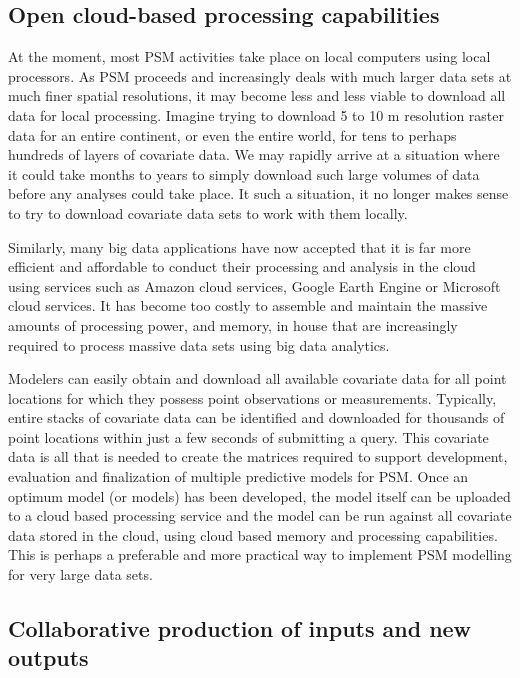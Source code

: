 \documentclass[graybox,natbib,nospthms,UStrade]{svmono}
\begin{document}
\hypertarget{open-cloud-based-processing-capabilities}{%
\subsection{Open cloud-based processing capabilities}\label{open-cloud-based-processing-capabilities}}

At the moment, most PSM activities take place on local computers using
local processors. As PSM proceeds and increasingly deals with much
larger data sets at much finer spatial resolutions, it may become less
and less viable to download all data for local processing. Imagine
trying to download 5 to 10 m resolution raster data for an entire
continent, or even the entire world, for tens to perhaps hundreds of
layers of covariate data. We may rapidly arrive at a situation where it
could take months to years to simply download such large volumes of data
before any analyses could take place. It such a situation, it no longer
makes sense to try to download covariate data sets to work with them
locally.

Similarly, many big data applications have now accepted that it is far
more efficient and affordable to conduct their processing and analysis
in the cloud using services such as Amazon cloud services, Google Earth
Engine or Microsoft cloud services. It has become too costly to assemble
and maintain the massive amounts of processing power, and memory, in
house that are increasingly required to process massive data sets using
big data analytics.

Modelers can easily obtain and download all available covariate data
for all point locations for which they possess point observations or
measurements. Typically, entire stacks of covariate data can be
identified and downloaded for thousands of point locations within just a
few seconds of submitting a query. This covariate data is all that is
needed to create the matrices required to support development,
evaluation and finalization of multiple predictive models for PSM. Once
an optimum model (or models) has been developed, the model itself can be
uploaded to a cloud based processing service and the model can be run
against all covariate data stored in the cloud, using cloud based memory
and processing capabilities. This is perhaps a preferable and more
practical way to implement PSM modelling for very large data sets.

\hypertarget{collaborative-production-of-inputs-and-new-outputs}{%
\subsection{Collaborative production of inputs and new outputs}\label{collaborative-production-of-inputs-and-new-outputs}}
\end{document}
